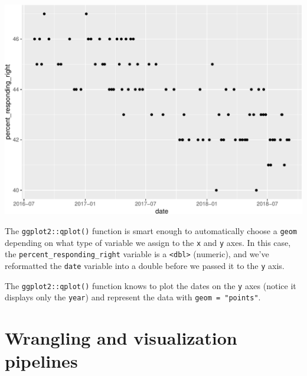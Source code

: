 \documentclass[letterpaper,12pt,twoside,]{pinp}
\begin{document}
\begin{Shaded}
\begin{Highlighting}[]
\SpecialCharTok{\%\textgreater{}\%} 
  \NormalTok{(}
\end{Highlighting}
\end{Shaded}

\begin{center}\includegraphics{03-intro-to-ggplot2_files/figure-latex/lubridate-date-1} \end{center}

The \texttt{ggplot2::qplot()} function is smart enough to automatically
choose a \texttt{geom} depending on what type of variable we assign to
the \texttt{x} and \texttt{y} axes. In this case, the
\texttt{percent\_responding\_right} variable is a
\texttt{\textless{}dbl\textgreater{}} (numeric), and we've reformatted
the \texttt{date} variable into a double before we passed it to the
\texttt{y} axis.

The \texttt{ggplot2::qplot()} function knows to plot the dates on the
\texttt{y} axes (notice it displays only the \texttt{year}) and
represent the data with \texttt{geom\ =\ "points"}.

\hypertarget{wrangling-and-visualization-pipelines}{%
\section{Wrangling and visualization
pipelines}\label{wrangling-and-visualization-pipelines}}
\end{document}
